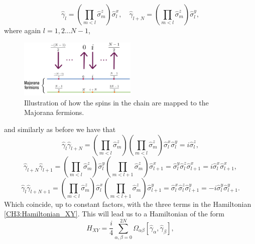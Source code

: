 \begin{equation}
\hat{\gamma}_{l}=\left(\prod_{m<l} \hat{\sigma}_{m}^{z}\right) \hat{\sigma}_{l}^{x}, \quad \hat{\gamma}_{l+N}=\left(\prod_{m<l} \hat{\sigma}_{m}^{z}\right) \hat{\sigma}_{l}^{y},
\end{equation}
where again $l=1,2\ldots N-1$,
\begin{figure}[H]
    \centering
    \includegraphics[width=0.5\textwidth]{Figures/ecuacion.png}
    \caption{Illustration of how the spins in the chain are mapped to the Majorana fermions.}
    \label{majorana fermions}
\end{figure}
and similarly as before we have that
\begin{equation}
\hat{\gamma}_{l} \hat{\gamma}_{l+N}=\left(\prod_{m<l} \hat{\sigma}_{m}^{z}\right)\left(\prod_{m<l} \hat{\sigma}_{m}^{z}\right) \hat{\sigma}_{l}^{x} \hat{\sigma}_{l}^{y}=i \hat{\sigma}_{l}^{z},
\end{equation}
\begin{equation}
\hat{\gamma}_{l+N} \hat{\gamma}_{l+1}=\left(\prod_{m<l} \hat{\sigma}_{m}^{z}\right) \hat{\sigma}_{l}^{y}\left(\prod_{m<l+1} \hat{\sigma}_{m}^{z}\right) \hat{\sigma}_{l+1}^{x}=\hat{\sigma}_{l}^{y} \hat{\sigma}_{l}^{z} \hat{\sigma}_{l+1}^{x}=i \hat{\sigma}_{l}^{x} \hat{\sigma}_{l+1}^{x},
\end{equation}
\begin{equation}
\hat{\gamma}_{l} \hat{\gamma}_{l+N+1}=\left(\prod_{m<l} \hat{\sigma}_{m}^{z}\right) \hat{\sigma}_{l}^{x}\left(\prod_{m<l+1} \hat{\sigma}_{m}^{z}\right) \hat{\sigma}_{l+1}^{y}=\hat{\sigma}_{l}^{x} \hat{\sigma}_{l}^{z} \hat{\sigma}_{l+1}^{y}=-i \hat{\sigma}_{l}^{y} \hat{\sigma}_{l+1}^{y}.
\end{equation}
Which coincide, up to constant factors, with the three terms in the Hamiltonian \eqref{CH3:Hamiltonian_XY}. This will lead us to a Hamiltonian of the form\cite{botero_bcs-like_2004,latorre_ground_2004}
\begin{equation}
H_{X Y}=\frac{i}{4} \sum_{\alpha, \beta=0}^{2 N} \Omega_{\alpha \beta}\left[\hat{\gamma}_{\alpha}, \hat{\gamma}_{\beta}\right],
\label{CH3:Hamiltonian_to_diagonalise}
\end{equation}
